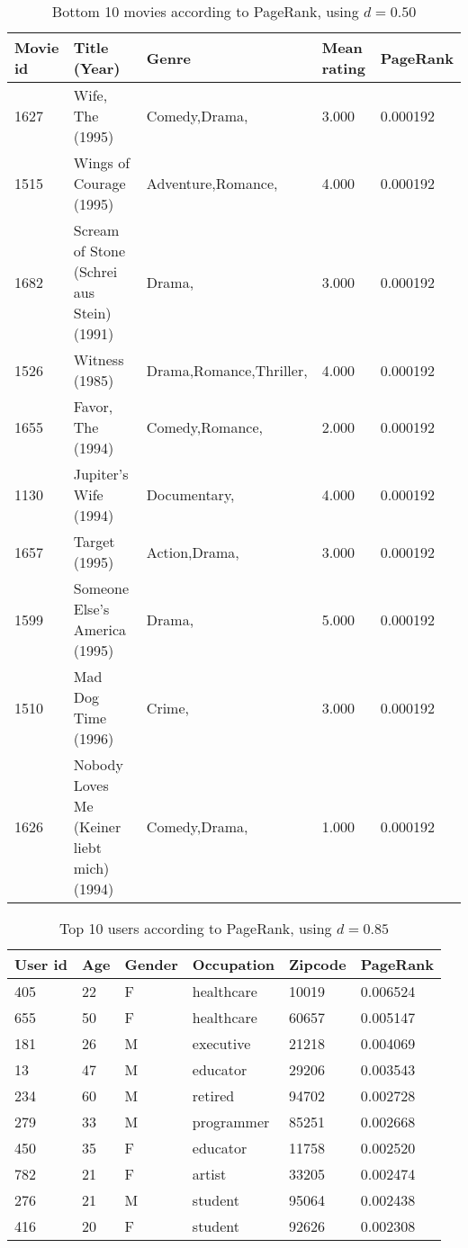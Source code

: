 \begin{table}[!htbp]
\hspace{-2cm}
\begin{tabular}{lllll}
Movie id & Title (Year) & Genre & Mean rating & PageRank \\
\hline
1627 & Wife, The (1995) & Comedy,Drama, & 3.000 & 0.000192 \\
1515 & Wings of Courage (1995) & Adventure,Romance, & 4.000 & 0.000192 \\
1682 & Scream of Stone (Schrei aus Stein) (1991) & Drama, & 3.000 & 0.000192 \\
1526 & Witness (1985) & Drama,Romance,Thriller, & 4.000 & 0.000192 \\
1655 & Favor, The (1994) & Comedy,Romance, & 2.000 & 0.000192 \\
1130 & Jupiter's Wife (1994) & Documentary, & 4.000 & 0.000192 \\
1657 & Target (1995) & Action,Drama, & 3.000 & 0.000192 \\
1599 & Someone Else's America (1995) & Drama, & 5.000 & 0.000192 \\
1510 & Mad Dog Time (1996) & Crime, & 3.000 & 0.000192 \\
1626 & Nobody Loves Me (Keiner liebt mich) (1994) & Comedy,Drama, & 1.000 & 0.000192 \\
\end{tabular}
\caption{Bottom 10 movies according to PageRank, using $d = 0.50$}
\label{tab:q49bottom10md50}
\end{table}

\begin{table}[!htbp]
\centering
\begin{tabular}{llllll}
User id & Age & Gender & Occupation & Zipcode & PageRank \\
\hline
405 & 22 & F & healthcare & 10019 & 0.006524 \\
655 & 50 & F & healthcare & 60657 & 0.005147 \\
181 & 26 & M & executive & 21218 & 0.004069 \\
13 & 47 & M & educator & 29206 & 0.003543 \\
234 & 60 & M & retired & 94702 & 0.002728 \\
279 & 33 & M & programmer & 85251 & 0.002668 \\
450 & 35 & F & educator & 11758 & 0.002520 \\
782 & 21 & F & artist & 33205 & 0.002474 \\
276 & 21 & M & student & 95064 & 0.002438 \\
416 & 20 & F & student & 92626 & 0.002308 \\
\end{tabular}
\caption{Top 10 users according to PageRank, using $d = 0.85$}
\label{tab:q49top10ud85}
\end{table}

